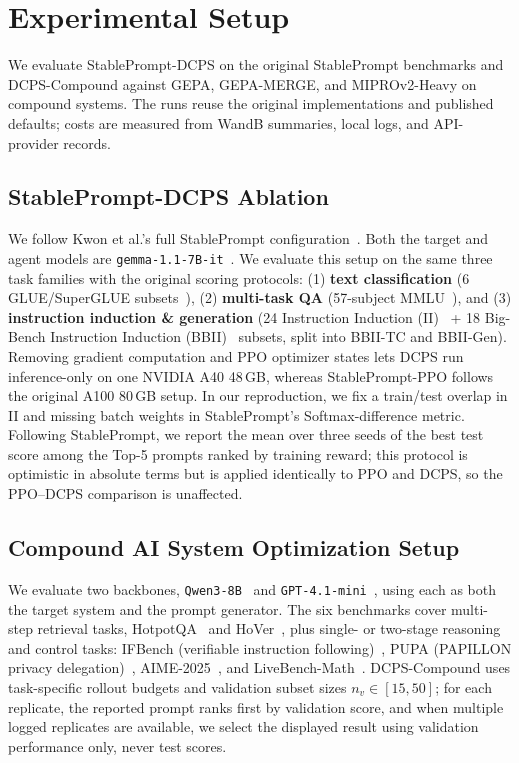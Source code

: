 \documentclass[runningheads]{llncs}
\begin{document}
\section{Experimental Setup}
\label{sec:exp-setup}

We evaluate StablePrompt-DCPS on the original StablePrompt benchmarks and DCPS-Compound against GEPA, GEPA-MERGE, and MIPROv2-Heavy on compound systems. The runs reuse the original implementations and published defaults; costs are measured from WandB summaries, local logs, and API-provider records.

\subsection{StablePrompt-DCPS Ablation}
\label{sec:phase1-setup}
We follow Kwon et al.'s full StablePrompt configuration~\cite{kwon2024stableprompt}. Both the target and agent models are \texttt{gemma-1.1-7B-it}~\cite{gemma2024}. We evaluate this setup on the same three task families with the original scoring protocols: (1) \textbf{text classification} (6 GLUE/SuperGLUE subsets~\cite{wang2018glue,wang2019superglue}), (2) \textbf{multi-task QA} (57-subject MMLU~\cite{hendrycks2020mmlu}), and (3) \textbf{instruction induction \& generation} (24 Instruction Induction (II)~\cite{honovich2022instruction} + 18 Big-Bench Instruction Induction (BBII)~\cite{zhou2023ape} subsets, split into BBII-TC and BBII-Gen). Removing gradient computation and PPO optimizer states lets DCPS run inference-only on one NVIDIA A40 48\,GB, whereas StablePrompt-PPO follows the original A100 80\,GB setup. In our reproduction, we fix a train/test overlap in II and missing batch weights in StablePrompt's Softmax-difference metric. Following StablePrompt, we report the mean over three seeds of the best test score among the Top-5 prompts ranked by training reward; this protocol is optimistic in absolute terms but is applied identically to PPO and DCPS, so the PPO--DCPS comparison is unaffected.

\subsection{Compound AI System Optimization Setup}
\label{sec:phase2-setup}
We evaluate two backbones, \texttt{Qwen3-8B}~\cite{qwen32025} and \texttt{GPT-4.1-mini}~\cite{openai2025gpt41}, using each as both the target system and the prompt generator. The six benchmarks cover multi-step retrieval tasks, HotpotQA~\cite{yang2018hotpotqa} and HoVer~\cite{jiang2020hover}, plus single- or two-stage reasoning and control tasks: IFBench (verifiable instruction following)~\cite{pyatkin2025ifbench}, PUPA (PAPILLON privacy delegation)~\cite{li2025papillon}, AIME-2025~\cite{aime2025}, and LiveBench-Math~\cite{livebench}. DCPS-Compound uses task-specific rollout budgets and validation subset sizes $n_v\!\in\![15,50]$; for each replicate, the reported prompt ranks first by validation score, and when multiple logged replicates are available, we select the displayed result using validation performance only, never test scores.
\end{document}
